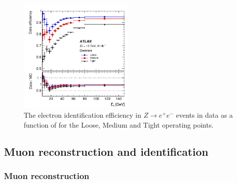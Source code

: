 \begin{figure}[H]
    \centering
    \includegraphics[width=0.5\textwidth]{Ch2/Img/Electron_ID_Eff.png}
    \caption{The electron identification efficiency in $Z\rightarrow e^+e^-$ events in data as a function of \eT for the Loose, Medium and Tight operating points.}
    \label{fig:chap2:Objects:Egamma:EID:Eff}
\end{figure}

\subsection{Muon reconstruction and identification}
\label{chap2:Objects:Muon}
\subsubsection{Muon reconstruction}
\label{chap2:Objects:Muon:Reco}


